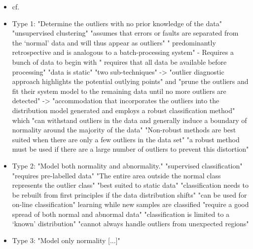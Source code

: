 	\begin{itemize}
		\item cf. \textcite{Hodge2004}
		\item Type 1: "Determine the outliers with no prior knowledge of the data" \parencite{Hodge2004}
			\subitem "unsupervised clustering" \parencite{Hodge2004}
			\subitem "assumes that errors or faults are separated from the ‘normal’ data and will thus appear as outliers" \parencite{Hodge2004}
			\subitem " predominantly retrospective and is analogous to a batch-processing system" \parencite{Hodge2004} - Requires a bunch of data to begin with
			\subitem " requires that all data be available before processing" \parencite{Hodge2004}
			\subitem "data is static" \parencite{Hodge2004}
			\subitem "two sub-techniques" \parencite{Hodge2004}
			\subitem -> "outlier diagnostic approach highlights the potential outlying points" \parencite{Hodge2004} and "prune the outliers and fit their system model to the remaining data until no more outliers are detected" \parencite{Hodge2004}
			\subitem -> "accommodation that incorporates the outliers into the distribution model generated and employs a robust classification method" \parencite{Hodge2004} which "can withstand outliers in the data and generally induce a boundary of normality around the majority of the data" \parencite{Hodge2004}
			\subitem "Non-robust methods are best suited when there are only a few outliers in the data set" \parencite{Hodge2004}
			\subitem "a robust method must be used if there are a large number of outliers to prevent this distortion" \parencite{Hodge2004}
		\item Type 2: "Model both normality and abnormality." \parencite{Hodge2004}
			\subitem "supervised classification" \parencite{Hodge2004}
			\subitem "requires pre-labelled data" \parencite{Hodge2004}
			\subitem "The entire area outside the normal class represents the outlier class" \parencite{Hodge2004}
			\subitem "best suited to static data" \parencite{Hodge2004} "classification needs to be rebuilt from first principles if the data distribution shifts" \parencite{Hodge2004}
			\subitem "can be used for on-line classification" \parencite{Hodge2004} learning while new samples are classified
			\subitem "require a good spread of both normal and abnormal data" \parencite{Hodge2004}
			\subitem "classification is limited to a ‘known’ distribution" \parencite{Hodge2004}
			\subitem "cannot always handle outliers from unexpected regions" \parencite{Hodge2004}
		\item Type 3: "Model only normality [...]" \parencite{Hodge2004}

\end{itemize}
